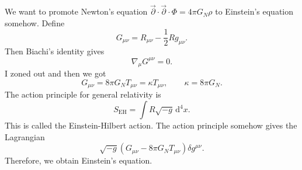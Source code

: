 
We want to promote Newton's equation $\vec{\partial }\cdot \vec{\partial }\cdot \Phi =4\pi G_N\rho $ to Einstein's equation somehow. Define
\[
	G_{\mu \nu } =R_{\mu \nu } -\frac{1}{2} R g_{\mu \nu } 
.\]
Then Biachi's identity gives
\[
	\nabla _\mu G^{\mu \nu } =0
.\]
I zoned out and then we got
\[
	G_{\mu \nu } =8\pi G_NT_{\mu \nu } =\kappa T_{\mu \nu } ,\qquad \kappa =8\pi G_N
.\]
The action principle for general relativity is
\[
	S_{\mathrm{EH} } =\int R\sqrt{-g}  \,\mathrm{d} ^4x
.\]
This is called the Einstein-Hilbert action. The action principle somehow gives the Lagrangian
\[
	\sqrt{-g} \left( G_{\mu \nu } -8\pi G_NT_{\mu \nu }  \right) \delta g^{\mu \nu } 
.\]
Therefore, we obtain Einstein's equation.
